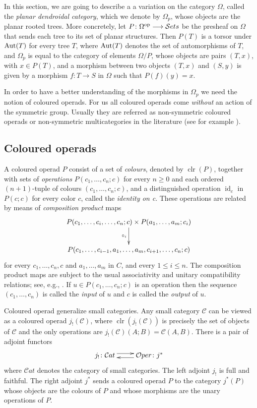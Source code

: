 \documentclass[a4paper]{amsart}
\theoremstyle{plain}
\theoremstyle{definition}
\theoremstyle{remark}
\DeclareMathOperator{\clr}{clr}
\DeclareMathOperator{\id}{id}
\newcommand{\rpd}{\Omega_p}
\newcommand{\Oper}{\mathcal{O}per}
\numberwithin{equation}{section}
\numberwithin{figure}{section}
\begin{document}
In this section, we are going to describe a a variation on the
category $\Omega$, called the \emph{planar dendroidal category},
which we denote by $\rpd$, whose objects are the planar rooted
trees. More concretely, let $P\colon \Omega^{\rm op}\longrightarrow
    \mathcal{S}ets$ be the presheaf on $\Omega$ that sends each tree to
its set of planar structures. Then $P(T)$ is a torsor under ${\rm
            Aut}(T)$ for every tree $T$, where ${\rm Aut}(T)$ denotes the set of
automorphisms of $T$, and $\rpd$ is equal to the category of
elements $\Omega/P$, whose objects are pairs $(T, x)$, with $x\in
    P(T)$, and a morphism between two objects $(T,x)$ and $(S,y)$ is
given by a morphism $f\colon T\longrightarrow S$ in $\Omega$ such
that $P(f)(y)=x$.

In order to have a better understanding of the morphisms in $\rpd$ we need the notion of
coloured operads. For us all coloured operads come \emph{without} an
action of the symmetric group. Usually they are referred as
non-symmetric coloured operads or non-symmetric multicategories in
the literature (see for example \cite{bergermoerdijk, markl}).

\subsection{Coloured operads}
A coloured operad $P$ consist of a set of \emph{colours}, denoted by
$\clr(P)$, together with sets of \emph{operations}
$P(c_1,\ldots,c_n;c)$ for every $n\ge 0$ and each ordered
$(n+1)$-tuple of colours $(c_1,\ldots, c_n; c)$, and a distinguished
operation $\id_c$ in $P(c;c)$ for every color $c$, called the
\emph{identity on c}. These operations are related by means of
\emph{composition product} maps
$$
    \xymatrix{P(c_1,\ldots, c_i,\ldots,c_n;c)\times P(a_1,\ldots,a_m;c_i)\ar[d]_-{\circ_i}\\
    P(c_1,\ldots, c_{i-1},a_1,\ldots,a_m,c_{i+1},\ldots,c_n;c)}
$$
for every $c_1, \ldots, c_n, c$ and $a_1,\ldots, a_m$ in $C$, and every $1\leq i\leq n$. The composition product
maps are subject to the usual associativity and unitary compatibility relations; see, e.g., \cite{leinster}.
If $u\in P(c_1,\ldots,c_n;c)$ is an operation then the sequence $(c_1,\ldots,c_n)$ is called the
\emph{input} of $u$ and $c$ is called the \emph{output} of $u$.

Coloured operad generalize small categories. Any small category
$\mathcal{C}$ can be viewed as a coloured operad
$j_!(\mathcal{C})$, where $\clr(j_!(\mathcal{C}))$
is precisely the set of objects of $\mathcal{C}$ and the only
operations are $j_!(\mathcal C)(A;B)=\mathcal{C}(A,B)$. There is a pair of
adjoint functors
$$
    \xymatrix{
        j_!\colon \mathcal{C}at \ar@<3pt>[r] & \ar@<3pt>[l] \Oper\colon j^*
    }
$$
where $\mathcal{C}at$ denotes the category of small categories. The left
adjoint $j_!$ is full and faithful. The right adjoint $j^*$ sends a
coloured operad $P$ to the category $j^*(P)$ whose objects are the
colours of $P$ and whose morphisms are the unary operations of $P$.
\end{document}
